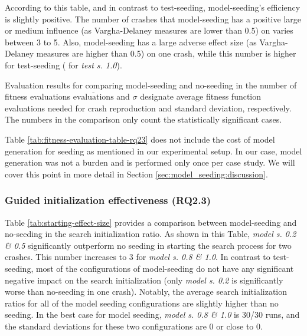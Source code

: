 According to this table, and in contrast to test-seeding, model-seeding's efficiency is slightly positive. The number of crashes that model-seeding has a positive large or medium influence (as Vargha-Delaney measures are lower than 0.5) on varies between 3 to 5.
Also, model-seeding has a large adverse effect size (as Vargha-Delaney measures are higher than 0.5) on one crash, while this number is higher for test-seeding ( for \textit{test s. 1.0}).
\begin{table} [t]
	\center
	\caption{Evaluation results for comparing model-seeding and no-seeding in the number of fitness evaluations $\overline{\text{evaluations}}$ and $\sigma$  designate average fitness function evaluations needed for crash reproduction and standard deviation, respectively. The numbers in the comparison only count the statistically significant cases.}
	\label{tab:fitness-evaluation-table-rq23}
	\begin{footnotesize}
	
	\end{footnotesize}
\end{table}
Table \ref{tab:fitness-evaluation-table-rq23} does not include the cost of model generation for seeding as mentioned in our experimental setup. In our case, model generation was not a burden and is performed only once per case study. We will cover this point in more detail in Section \ref{sec:model_seeding:discussion}.    




\subsubsection{Guided initialization effectiveness (\textbf{RQ2.3})}

Table \ref{tab:starting-effect-size}  provides a comparison between model-seeding and no-seeding in the search initialization ratio. As shown in this Table, \textit{model s. 0.2 \& 0.5} significantly outperform no seeding in starting the search process for two crashes. This number increases to 3 for \textit{model s. 0.8 \& 1.0}. In contrast to test-seeding, most of the configurations of model-seeding do not have any significant negative impact on the search initialization (only \textit{model s. 0.2} is significantly worse than no-seeding in one crash). Notably, the average search initialization ratios for all of the model seeding configurations are slightly higher than no seeding. In the best case for model seeding, \textit{model s. 0.8 \& 1.0} is 30/30 runs, and the standard deviations for these two configurations are 0 or close to 0.


